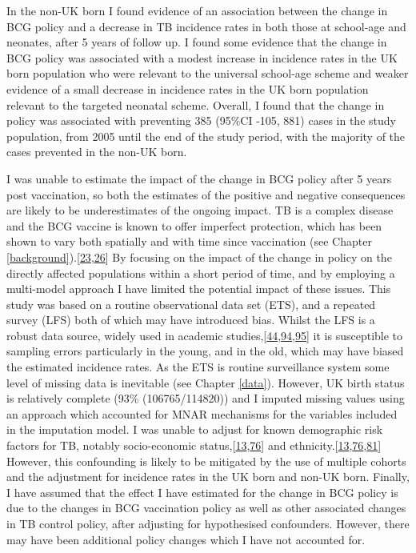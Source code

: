 \documentclass[11pt,twoside]{bristolthesis}
\begin{document}
  In the non-UK born I found evidence of an association between the change in BCG policy and a decrease in TB incidence rates in both those at school-age and neonates, after 5 years of follow up. I found some evidence that the change in BCG policy was associated with a modest increase in incidence rates in the UK born population who were relevant to the universal school-age scheme and weaker evidence of a small decrease in incidence rates in the UK born population relevant to the targeted neonatal scheme. Overall, I found that the change in policy was associated with preventing 385 (95\%CI -105, 881) cases in the study population, from 2005 until the end of the study period, with the majority of the cases prevented in the non-UK born.
  
  I was unable to estimate the impact of the change in BCG policy after 5 years post vaccination, so both the estimates of the positive and negative consequences are likely to be underestimates of the ongoing impact. TB is a complex disease and the BCG vaccine is known to offer imperfect protection, which has been shown to vary both spatially and with time since vaccination (see Chapter \ref{background}).{[}\protect\hyperlink{ref-Mangtani2014a}{23},\protect\hyperlink{ref-Abubakar2013}{26}{]} By focusing on the impact of the change in policy on the directly affected populations within a short period of time, and by employing a multi-model approach I have limited the potential impact of these issues. This study was based on a routine observational data set (ETS), and a repeated survey (LFS) both of which may have introduced bias. Whilst the LFS is a robust data source, widely used in academic studies,{[}\protect\hyperlink{ref-French2007}{44},\protect\hyperlink{ref-Davies2016a}{94},\protect\hyperlink{ref-Lindley2009}{95}{]} it is susceptible to sampling errors particularly in the young, and in the old, which may have biased the estimated incidence rates. As the ETS is routine surveillance system some level of missing data is inevitable (see Chapter \ref{data}). However, UK birth status is relatively complete (93\% (106765/114820)) and I imputed missing values using an approach which accounted for MNAR mechanisms for the variables included in the imputation model. I was unable to adjust for known demographic risk factors for TB, notably socio-economic status,{[}\protect\hyperlink{ref-Bhatti1995}{13},\protect\hyperlink{ref-Parslow2001}{76}{]} and ethnicity.{[}\protect\hyperlink{ref-Bhatti1995}{13},\protect\hyperlink{ref-Parslow2001}{76},\protect\hyperlink{ref-Abubakar2008}{81}{]} However, this confounding is likely to be mitigated by the use of multiple cohorts and the adjustment for incidence rates in the UK born and non-UK born. Finally, I have assumed that the effect I have estimated for the change in BCG policy is due to the changes in BCG vaccination policy as well as other associated changes in TB control policy, after adjusting for hypothesised confounders. However, there may have been additional policy changes which I have not accounted for.
  
\end{document}
